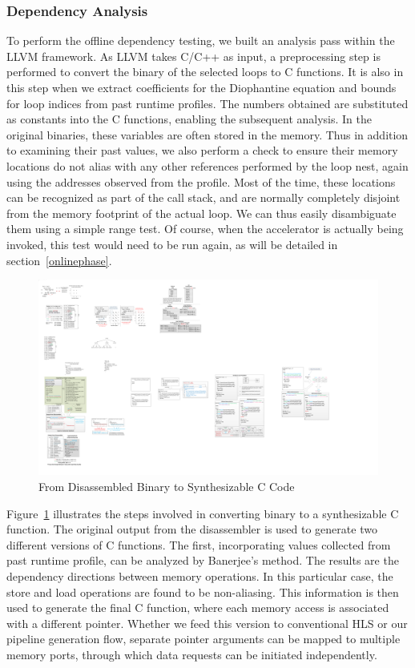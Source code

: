 \subsubsection{Dependency Analysis}
To perform the offline dependency testing, we built an analysis pass within the LLVM framework. As LLVM takes C/C++ as input, a preprocessing step is performed
to convert the binary of the selected loops to C functions. It is also in this step when we extract coefficients for the Diophantine equation and bounds for loop indices from past runtime profiles.
The numbers obtained are substituted as constants into the C functions, enabling the subsequent analysis. 
In the original binaries, these variables are often stored in the memory. 
Thus in addition to examining their past values, we also perform a check to ensure their memory locations do not alias with any other references performed by the loop nest, again using the addresses observed from the profile. Most of the time, these locations can be
recognized as part of the call stack, and are normally completely disjoint from
the memory footprint of the actual loop. We can thus easily disambiguate them using a simple
range test. Of course, when the accelerator is actually being invoked, this test would need to be run again, as will be detailed in section~\ref{onlinephase}.


\begin{figure}[htp]
\begin{center}
\includegraphics[width=0.9\linewidth]{chap6fig/analysisSteps.pdf}
\caption{From Disassembled Binary to Synthesizable C Code
\label{fig:mainSteps}}
\end{center}
\end{figure}

 
Figure~\ref{fig:mainSteps} illustrates the steps involved in converting binary to a synthesizable C function. 
The original output from the disassembler is used to generate two
different versions of C functions. The first, incorporating values collected from past runtime profile, can be analyzed by Banerjee's method. The results are the dependency directions between memory operations. In this particular case, the store and load operations are found to be non-aliasing. This information is then used to generate the final C function, where each memory access is associated with a different pointer. Whether we
feed this version to conventional HLS or our pipeline generation flow, separate pointer
arguments can be mapped to multiple memory ports, through which data requests can be initiated
independently.

